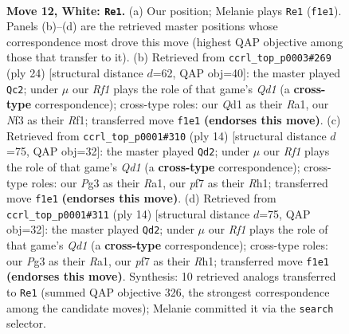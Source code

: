 \documentclass[11pt]{article}
\begin{document}
\clearpage

\begin{figure}[p]\centering
\begin{subfigure}{0.46\textwidth}\centering
\resizebox{\linewidth}{!}{%
\newchessgame
\chessboard[
  setfen={rnbq1rk1/1p3p2/4pnp1/p2p3p/3P4/2NB1NP1/PPP2PP1/2RQ1RK1 w - - 0 12},
  showmover=false,
  pgfstyle=straightmove, color=movearrow, markmove={f1-e1}
]}
\caption{}
\end{subfigure}\hfill
\begin{subfigure}{0.46\textwidth}\centering
\resizebox{\linewidth}{!}{%
\newchessgame
\chessboard[
  setfen={r2qkb1r/pp3p2/1np1b2p/3p2p1/3P4/2NBPNP1/PP3PP1/R2Q1RK1 w kq - 3 13},
  showmover=false,
  pgfstyle=straightmove, color=movearrow, markmove={d1-c2}
]}
\caption{}
\end{subfigure}
\\[4pt]
\begin{subfigure}{0.46\textwidth}\centering
\resizebox{\linewidth}{!}{%
\newchessgame
\chessboard[
  setfen={rnbqk2r/1p2ppbp/p2p1np1/8/3NP3/2N1B2P/PPP2PP1/R2QKB1R w KQkq - 2 8},
  showmover=false,
  pgfstyle=straightmove, color=movearrow, markmove={d1-d2}
]}
\caption{}
\end{subfigure}\hfill
\begin{subfigure}{0.46\textwidth}\centering
\resizebox{\linewidth}{!}{%
\newchessgame
\chessboard[
  setfen={rnbqk2r/1p2ppbp/p2p1np1/8/3NP3/2N1B2P/PPP2PP1/R2QKB1R w KQkq - 2 8},
  showmover=false,
  pgfstyle=straightmove, color=movearrow, markmove={d1-d2}
]}
\caption{}
\end{subfigure}
\caption{\textbf{Move 12, White: \texttt{Re1}.} (a) Our position; Melanie plays \texttt{Re1} (\texttt{f1e1}). Panels (b)--(d) are the retrieved master positions whose correspondence most drove this move (highest QAP objective among those that transfer to it). (b) Retrieved from \texttt{ccrl\_top\_p0003\#269} (ply 24) [structural distance $d$=62, QAP obj=40]: the master played \texttt{Qc2}; under $\mu$ our \emph{Rf1} plays the role of that game's \emph{Qd1} (a \textbf{cross-type} correspondence); cross-type roles: our \emph{Q}d1 as their \emph{R}a1, our \emph{N}f3 as their \emph{R}f1; transferred move \texttt{f1e1} \textbf{(endorses this move)}. (c) Retrieved from \texttt{ccrl\_top\_p0001\#310} (ply 14) [structural distance $d$=75, QAP obj=32]: the master played \texttt{Qd2}; under $\mu$ our \emph{Rf1} plays the role of that game's \emph{Qd1} (a \textbf{cross-type} correspondence); cross-type roles: our \emph{P}g3 as their \emph{R}a1, our \emph{p}f7 as their \emph{R}h1; transferred move \texttt{f1e1} \textbf{(endorses this move)}. (d) Retrieved from \texttt{ccrl\_top\_p0001\#311} (ply 14) [structural distance $d$=75, QAP obj=32]: the master played \texttt{Qd2}; under $\mu$ our \emph{Rf1} plays the role of that game's \emph{Qd1} (a \textbf{cross-type} correspondence); cross-type roles: our \emph{P}g3 as their \emph{R}a1, our \emph{p}f7 as their \emph{R}h1; transferred move \texttt{f1e1} \textbf{(endorses this move)}. Synthesis: 10 retrieved analogs transferred to \texttt{Re1} (summed QAP objective 326, the strongest correspondence among the candidate moves); Melanie committed it via the \texttt{search} selector.}
\label{fig:thought-m22}
\end{figure}
\end{document}
